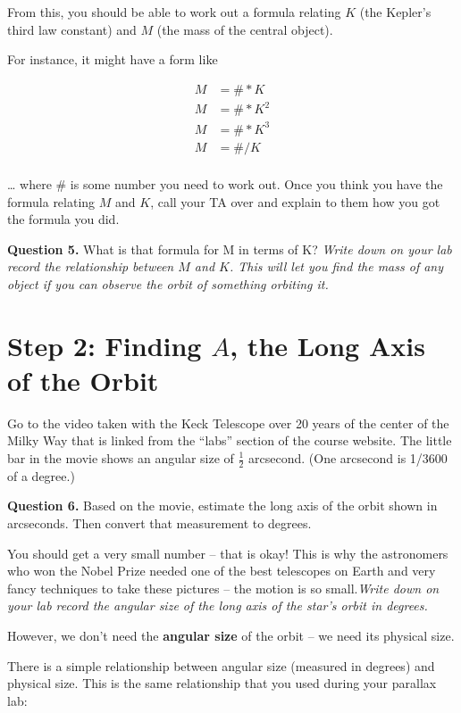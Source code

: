 \documentclass[11pt]{article}
\begin{document}
From this, you should be able to work out a formula relating $K$ (the Kepler’s third law constant) and $M$ (the mass of the central object).

For instance, it might have a form like

\begin{align*}
M &= \# * K \\
M &= \# * K^2 \\
M &= \# * K^3 \\
M &= \# / K \\
\end{align*}

… where \# is some number you need to work out. Once you think you have the formula relating $M$ and $K$, call your TA over and explain to them how you got the formula you did.

{\bf Question 5.} What is that formula for M in terms of K? {\it Write down on your lab record the relationship between $M$ and $K$. This will let you find the mass of any object
if you can observe the orbit of something orbiting it.}



\section{Step 2: Finding $A$, the Long Axis of the Orbit}

Go to the video taken with the Keck Telescope over 20 years of the center of the Milky Way that is linked from the ``labs'' section of the course website. The little bar in the movie shows an angular size of $\frac{1}{2}$ arcsecond. (One arcsecond is 1/3600 of a degree.) 

{\bf Question 6.} Based on the movie, estimate the long axis of the orbit shown in arcseconds. Then convert that measurement to degrees. 

You should get a very small number -- that is okay! This is why the astronomers who won the Nobel Prize needed one of the best telescopes on Earth and very fancy techniques to take these pictures -- the motion is so small.{\it Write down on your lab record the angular size of the long axis of the star's orbit in degrees.}

However, we don’t need the {\bf angular size} of the orbit -- we need its physical size. 

There is a simple relationship between angular size (measured in degrees) and physical size. This is the same relationship that you used during your parallax lab:
\end{document}
